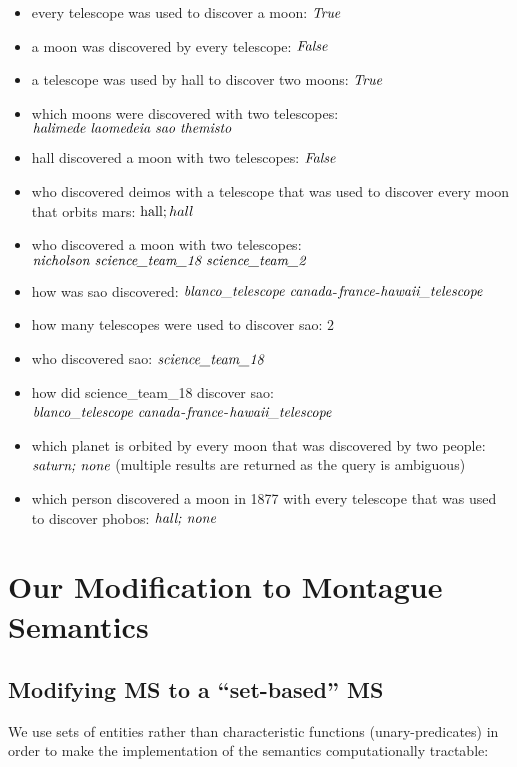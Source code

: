 \documentclass[../main.tex]{subfiles}
\begin{document}
\begin{refsection}
\begin{itemize}
	\setlength\itemsep{0em}
	\item every telescope was used to discover a moon: $\operatorname{\mathit{True}}$
	\item a moon was discovered by every telescope: $\operatorname{\mathit{False}}$
	\item a telescope was used by hall to discover two moons: $\operatorname{\mathit{True}}$
	\item which moons were discovered with two telescopes: \\$\textit{halimede laomedeia sao themisto}$
	\item hall discovered a moon with two telescopes: $\operatorname{\mathit{False}}$
	\item who discovered deimos with a telescope that was used to discover every moon that orbits mars: $\operatorname{hall};hall$
	\item who discovered a moon with two telescopes: \\ $\dmathit{nicholson science\_team\_18\ science\_team\_2}$
	\item how was sao discovered: $\textit{blanco\_telescope canada}$-$\textit{france}$-$\textit{hawaii\_telescope}$
	\item how many telescopes were used to discover sao: $2$
	\item who discovered sao: $\textit{science\_team\_18}$
	\item how did science\_team\_18 discover sao: \\ $\textit{blanco\_telescope canada}$-$\textit{france}$-$\textit{hawaii\_telescope}$
	\item which planet is orbited by every moon that was discovered by two people: $\textit{saturn; none}$ (multiple results are returned as the query is ambiguous)
	\item which person discovered a moon in 1877 with every telescope that was used to discover phobos: $\textit{hall; none}$
\end{itemize}

\section{Our Modification to Montague Semantics}
\label{ext:modification}
\subsection{Modifying MS to a ``set-based'' MS}

We use sets of entities rather than characteristic functions (unary-predicates) in order to make the
implementation of the semantics computationally tractable:


\end{refsection}
\end{document}
